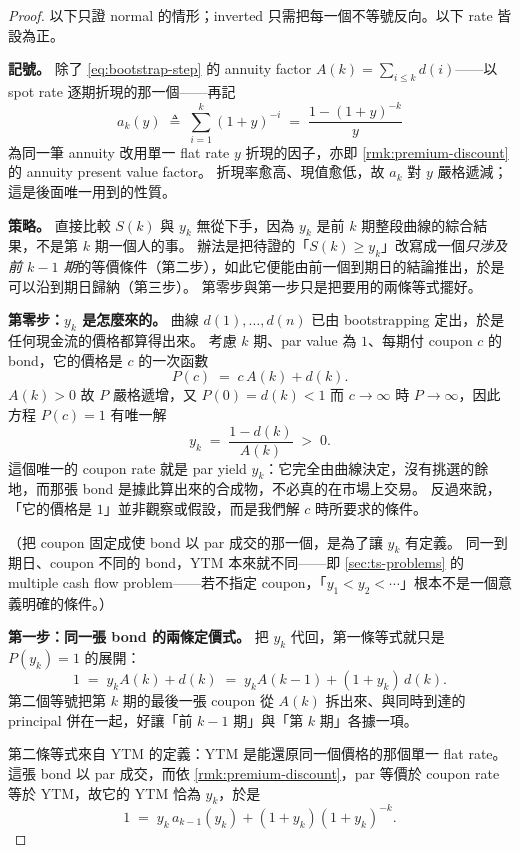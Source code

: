 \begin{proof}
	以下只證 normal 的情形；inverted 只需把每一個不等號反向。以下 rate 皆設為正。

	\textbf{記號。}
	除了 \eqref{eq:bootstrap-step} 的 annuity factor $A(k)=\sum_{i\le k}d(i)$——以 spot rate 逐期折現的那一個——再記
	\[
		a_{k}(y) \;\triangleq\; \sum_{i=1}^{k}(1+y)^{-i} \;=\; \frac{1-(1+y)^{-k}}{y}
	\]
	為同一筆 annuity 改用單一 flat rate $y$ 折現的因子，亦即 \autoref{rmk:premium-discount} 的 annuity present value factor。
	折現率愈高、現值愈低，故 $a_{k}$ 對 $y$ 嚴格遞減；這是後面唯一用到的性質。

	\textbf{策略。}
	直接比較 $S(k)$ 與 $y_{k}$ 無從下手，因為 $y_{k}$ 是前 $k$ 期整段曲線的綜合結果，不是第 $k$ 期一個人的事。
	辦法是把待證的「$S(k)\ge y_{k}$」改寫成一個\emph{只涉及前 $k-1$ 期}的等價條件（第二步），如此它便能由前一個到期日的結論推出，於是可以沿到期日歸納（第三步）。
	第零步與第一步只是把要用的兩條等式擺好。

	\textbf{第零步：$y_{k}$ 是怎麼來的。}
	曲線 $d(1),\ldots,d(n)$ 已由 bootstrapping 定出，於是任何現金流的價格都算得出來。
	考慮 $k$ 期、par value 為 $1$、每期付 coupon $c$ 的 bond，它的價格是 $c$ 的一次函數
	\[
		P(c) \;=\; c\,A(k) + d(k) .
	\]
	$A(k)>0$ 故 $P$ 嚴格遞增，又 $P(0)=d(k)<1$ 而 $c\to\infty$ 時 $P\to\infty$，因此方程 $P(c)=1$ 有唯一解
	\[
		y_{k} \;=\; \frac{1-d(k)}{A(k)} \;>\; 0 .
	\]
	這個唯一的 coupon rate 就是 par yield $y_{k}$：它完全由曲線決定，沒有挑選的餘地，而那張 bond 是據此算出來的合成物，不必真的在市場上交易。
	反過來說，「它的價格是 $1$」並非觀察或假設，而是我們解 $c$ 時所要求的條件。

	（把 coupon 固定成使 bond 以 par 成交的那一個，是為了讓 $y_{k}$ 有定義。
	同一到期日、coupon 不同的 bond，YTM 本來就不同——即 \autoref{sec:ts-problems} 的 multiple cash flow problem——若不指定 coupon，「$y_{1}<y_{2}<\cdots$」根本不是一個意義明確的條件。）

	\textbf{第一步：同一張 bond 的兩條定價式。}
	把 $y_{k}$ 代回，第一條等式就只是 $P(y_{k})=1$ 的展開：
	\begin{equation}
		1 \;=\; y_{k}A(k) + d(k) \;=\; y_{k}A(k-1) + (1+y_{k})\,d(k) . \label{eq:par-curve}
	\end{equation}
	第二個等號把第 $k$ 期的最後一張 coupon 從 $A(k)$ 拆出來、與同時到達的 principal 併在一起，好讓「前 $k-1$ 期」與「第 $k$ 期」各據一項。

	第二條等式來自 YTM 的定義：YTM 是能還原同一個價格的那個單一 flat rate。
	這張 bond 以 par 成交，而依 \autoref{rmk:premium-discount}，par 等價於 coupon rate 等於 YTM，故它的 YTM 恰為 $y_{k}$，於是
	\begin{equation}
		1 \;=\; y_{k}\,a_{k-1}(y_{k}) + (1+y_{k})(1+y_{k})^{-k} . \label{eq:par-flat}
	\end{equation}


\end{proof}
